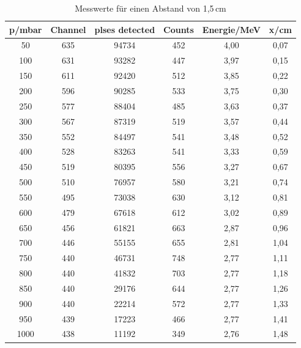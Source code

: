\begin{table}
  \centering
  \caption{Messwerte für einen Abstand von 1,5\,cm}
  \label{tab:15cm}
  \begin{tabular}{c c c c c c}
    \toprule
    p/mbar & Channel & plses detected & Counts & Energie/MeV & x/cm\\
    \midrule
    50  & 635 & 94734 & 452 & 4,00 & 0,07\\
    100 & 631 & 93282 & 447 & 3,97 & 0,15\\
    150 & 611 & 92420 & 512 & 3,85 & 0,22\\
    200 & 596 & 90285 & 533 & 3,75 & 0,30\\
    250 & 577 & 88404 & 485 & 3,63 & 0,37\\
    300 & 567 & 87319 & 519 & 3,57 & 0,44\\
    350 & 552 & 84497 & 541 & 3,48 & 0,52\\
    400 & 528 & 83263 & 541 & 3,33 & 0,59\\
    450 & 519 & 80395 & 556 & 3,27 & 0,67\\
    500 & 510 & 76957 & 580 & 3,21 & 0,74\\
    550 & 495 & 73038 & 630 & 3,12 & 0,81\\
    600 & 479 & 67618 & 612 & 3,02 & 0,89\\
    650 & 456 & 61821 & 663 & 2,87 & 0,96\\
    700 & 446 & 55155 & 655 & 2,81 & 1,04\\
    750 & 440 & 46731 & 748 & 2,77 & 1,11\\
    800 & 440 & 41832 & 703 & 2,77 & 1,18\\
    850 & 440 & 29176 & 644 & 2,77 & 1,26\\
    900 & 440 & 22214 & 572 & 2,77 & 1,33\\
    950 & 439 & 17223 & 466 & 2,77 & 1,41\\
    1000& 438 & 11192 & 349 & 2,76 & 1,48\\
    \bottomrule
  \end{tabular}
\end{table}

